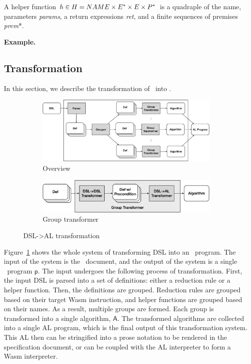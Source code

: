 A helper function $h \in H = NAME \times E^\ast \times E \times P^\ast$ is a quadraple of
the name, parameters \textit{params}, a return expressions \textit{ret}, and a finite sequences of premises \textit{prem}*.

\textbf{Example.} 

\subsection{Transformation}
In this section, we describe the transformation of \dsl~into \al.

\begin{figure}
  \centering
  \begin{subfigure}[b]{0.9\textwidth}
    \includegraphics[width=\textwidth]{img/trans1}
    \caption{Overview}
    \label{fig:overview}
  \end{subfigure}
  \hfill
  \begin{subfigure}[b]{0.9\textwidth}
    \includegraphics[width=\textwidth]{img/trans2}
    \caption{Group transformer}
    \label{fig:grouptrans}
  \end{subfigure}
  \caption{DSL->AL transformation}
  \label{fig:trans}
\end{figure}


Figure~\ref{fig:overview} shows the whole system of transforming DSL into an \al~program.
The input of the system is the \dsl~document,
and the output of the system is a single \al~program $\mathsf{p}$.
The input undergoes the following process of transformation.
First, the input DSL is parsed into a set of definitions: either a reduction rule or a
helper function. Then, the definitions are grouped. Reduction rules are grouped based on
their target Wasm instruction, and helper functions are grouped based on their names.
As a result, multiple groups are formed. Each group is transformed into a single algorithm,
$\mathsf{A}$. The transformed algorithms are collected into a single AL program, which is the
final output of this transformation system. This AL then can be stringified into a
prose notation to be rendered in the specification document, or can be coupled with the AL interpreter to form a Wasm interpreter.


